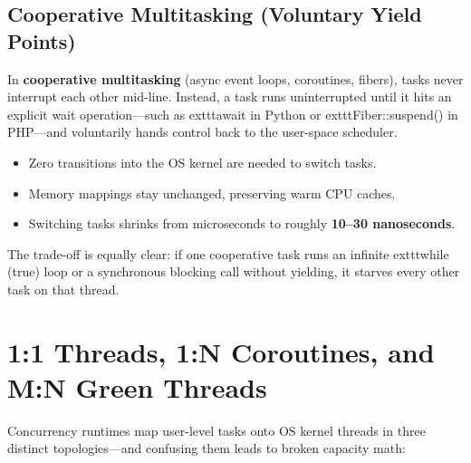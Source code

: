 \subsection{Cooperative Multitasking (Voluntary Yield Points)}

In \textbf{cooperative multitasking} (async event loops, coroutines, fibers), tasks never interrupt each other mid-line. Instead, a task runs uninterrupted until it hits an explicit wait operation---such as 	exttt{await} in Python or 	exttt{Fiber::suspend()} in PHP---and voluntarily hands control back to the user-space scheduler.
\begin{itemize}[leftmargin=15pt]
  \item Zero transitions into the OS kernel are needed to switch tasks.
  \item Memory mappings stay unchanged, preserving warm CPU caches.
  \item Switching tasks shrinks from microseconds to roughly \textbf{10--30 nanoseconds}.
\end{itemize}
The trade-off is equally clear: if one cooperative task runs an infinite 	exttt{while (true)} loop or a synchronous blocking call without yielding, it starves every other task on that thread.

\section{1:1 Threads, 1:N Coroutines, and M:N Green Threads}

Concurrency runtimes map user-level tasks onto OS kernel threads in three distinct topologies---and confusing them leads to broken capacity math:

